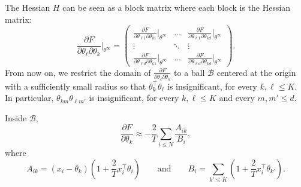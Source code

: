 The Hessian $H$ can be seen as a block matrix where each block is the
Hessian matrix:
%
\begin{equation}
\frac{\partial F}{\partial \theta_\ell \partial \theta_k}\Bigr|_{\theta^\infty} = 
\left(
\begin{array}{ccc}
\displaystyle
\frac{\partial F}{\partial \theta_{\ell 1} \partial \theta_{k 1}}\Bigr|_{\theta^\infty} & \ldots & \displaystyle\frac{\partial F}{\partial \theta_{\ell 1} \partial \theta_{k d}}\Bigr|_{\theta^\infty}\\
\vdots & \ddots & \vdots\\
\displaystyle\frac{\partial F}{\partial \theta_{\ell d} \partial \theta_{k 1}}\Bigr|_{\theta^\infty} & \ldots & \displaystyle\frac{\partial F}{\partial \theta_{\ell d} \partial \theta_{k d}}\Bigr|_{\theta^\infty}
\end{array}
\right).
\end{equation}
%
From now on, we restrict the domain of $\frac{\partial F}{\partial \theta_\ell \partial \theta_k}$ to a ball $\mathcal{B}$ centered at the origin with a sufficiently small radius so that $\theta_k^\top \theta_\ell$ is insignificant, for every $k, \ell \leq K$. In particular, $\theta_{km}\theta_{\ell m'}$ is insignificant, for every $k, \ell \leq K$ and every $m, m' \leq d$.

\begin{lemma}
Inside $\mathcal{B}$,
%
\begin{equation}
\frac{\partial F}{\partial \theta_k} \approx -\frac{2}{T}\sum_{i \leq N} \frac{A_{ik}}{B_i},
\end{equation}
%
where
%
\begin{equation}
A_{ik} = (x_i - \theta_k)\left(1 + \frac{2}{T}x_i^\top \theta_i\right) \qquad \text{and} \qquad B_i = \sum_{k' \leq K}\left(1 + \frac{2}{T}x_i^\top \theta_{k'}\right).
\end{equation}
%
\label{lem:approx_deriv}
\end{lemma}

